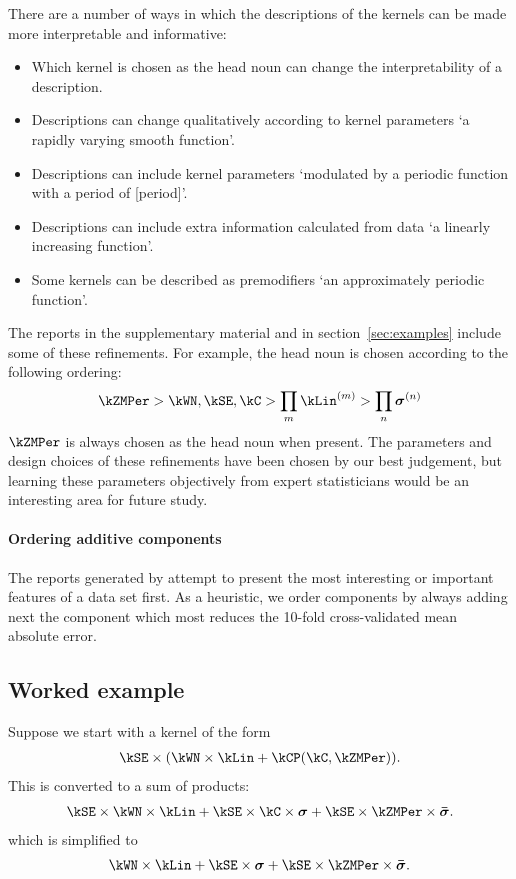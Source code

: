 There are a number of ways in which the descriptions of the kernels can be made more interpretable and informative:
\begin{itemize}
  \item Which kernel is chosen as the head noun can change the interpretability of a description.
  \item Descriptions can change qualitatively according to kernel parameters \eg `a rapidly varying smooth function'.
  \item Descriptions can include kernel parameters \eg `modulated by a periodic function with a period of [period]'.
  \item Descriptions can include extra information calculated from data \eg `a linearly increasing function'.
  \item Some kernels can be described as premodifiers \eg `an approximately periodic function'.
\end{itemize}

The reports in the supplementary material and in section~\ref{sec:examples} include some of these refinements.
For example, the head noun is chosen according to the following ordering:
\begin{align*}
\kZMPer > \kWN, \kSE, \kC > \prod_m \kLin^{(m)} > \prod_n \boldsymbol\sigma^{(n)}
\end{align*}
\ie $\kZMPer$ is always chosen as the head noun when present.
The parameters and design choices of these refinements have been chosen by our best judgement, but learning these parameters objectively from expert statisticians would be an interesting area for future study.

\paragraph{Ordering additive components}

The reports generated by \procedurename{} attempt to present the most interesting or important features of a data set first.
As a heuristic, we order components by always adding next the component which most reduces the 10-fold cross-validated mean absolute error.

\subsection{Worked example}

Suppose we start with a kernel of the form
\begin{align*}
\kSE \times (\kWN \times \kLin + \kCP(\kC, \kZMPer)).
\end{align*}
This is converted to a sum of products:
\begin{align*}
\kSE \times \kWN \times \kLin + \kSE \times \kC \times \boldsymbol{\sigma} + \kSE \times \kZMPer \times \boldsymbol{\bar\sigma}.
\end{align*}
which is simplified to
\begin{align*}
\kWN \times \kLin + \kSE \times \boldsymbol{\sigma} + \kSE \times \kZMPer \times \boldsymbol{\bar\sigma}.
\end{align*}

